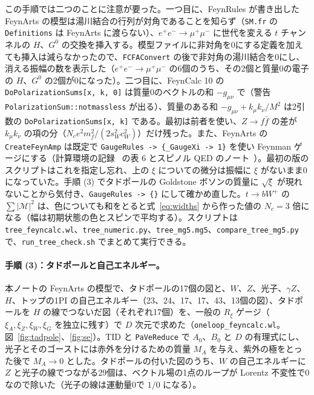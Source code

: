 \documentclass[a4paper,10pt]{ltjsarticle}
\newcommand{\sw}{s_W}
\newcommand{\cw}{c_W}
\begin{document}
この手順では二つのことに注意が要った。一つ目に、FeynRules が書き出した FeynArts の模型は湯川結合の行列が対角であることを知らず（\texttt{SM.fr} の \texttt{Definitions} は FeynArts に渡らない）、$e^+e^-\to\mu^+\mu^-$ に世代を変える $t$ チャンネルの $H$、$G^0$ の交換を挿入する。模型ファイルに非対角を0にする定義を加えても挿入は減らなかったので、\texttt{FCFAConvert} の後で非対角の湯川結合を0にし、消える振幅の数を表示した（$e^+e^-\to\mu^+\mu^-$ の6個のうち、その2個と質量0の電子の $H$、$G^0$ の2個が0になった）。二つ目に、FeynCalc 10 の \texttt{DoPolarizationSums[x, k, 0]} は質量0のベクトルの和 $-g_{\mu\nu}$ で（警告 \texttt{PolarizationSum::notmassless} が出る）、質量のある和 $-g_{\mu\nu}+k_\mu k_\nu/M^2$ は2引数の \texttt{DoPolarizationSums[x, k]} である。最初は前者を使い、$Z\to f\bar f$ の差が $k_\mu k_\nu$ の項の分（$N_ce^2m_f^2/(2\sw^2\cw^2)$）だけ残った。また、FeynArts の \texttt{CreateFeynAmp} は既定で \texttt{GaugeRules -> \{\_GaugeXi -> 1\}} を使い Feynman ゲージにする（計算環境の記録~\cite{env} の表 6 とスピノル QED のノート~\cite{qednote}）。最初の版のスクリプトはこれを指定し忘れ、上の $\xi$ についての微分は振幅に $\xi$ がないまま0になっていた。手順 (3) でタドポールの Goldstone ボソンの質量に $\sqrt\xi$ が現れないことから気付き、\texttt{GaugeRules -> \{\}} にして確かめ直した。$t\to bW^+$ の $\sum|\mathcal M|^2$ は、色についても和をとると式~\eqref{eq:widths} から作った値の $N_c=3$ 倍になる（幅は初期状態の色とスピンで平均する）。スクリプトは \texttt{tree\_feyncalc.wl}、\texttt{tree\_numeric.py}、\texttt{tree\_mg5.mg5}、\texttt{compare\_tree\_mg5.py} で、\texttt{run\_tree\_check.sh} でまとめて実行できる。

\paragraph{手順 (3)：タドポールと自己エネルギー。}本ノートの FeynArts の模型で、タドポールの17個の図と、$W$、$Z$、光子、$\gamma Z$、$H$、トップの1PI の自己エネルギー（23、24、17、17、43、13個の図）、タドポールを $H$ の線でつないだ図（それぞれ17個）を、一般の $R_\xi$ ゲージ（$\xi_A,\xi_Z,\xi_W,\xi_G$ を独立に残す）で $D$ 次元で求めた（\texttt{oneloop\_feyncalc.wl}。図~\ref{fig:tadpole}、\ref{fig:se}）。TID と \texttt{PaVeReduce} で $A_0$、$B_0$ と $D$ の有理式にし、光子とそのゴーストには赤外を分けるための質量 $M_A$ を与え、紫外の極をとった後で $M_A\to0$ とした。タドポールの付いた図のうち、$W$ の自己エネルギーに $Z$ と光子の線でつながる29個は、ベクトル場の1点のループが Lorentz 不変性で0なので除いた（光子の線は運動量0で $1/0$ になる）。
\end{document}
